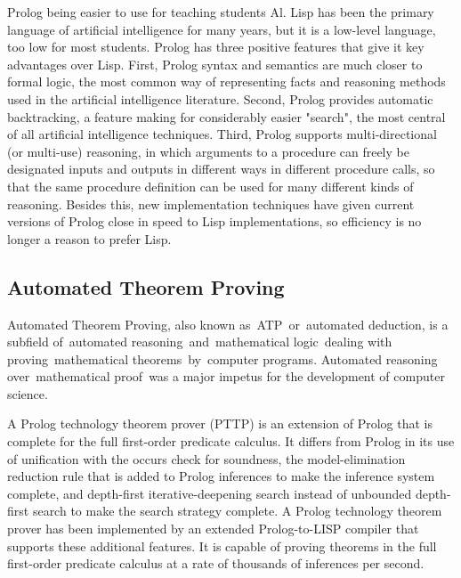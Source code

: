 \documentclass[14pt]{article}
\begin{document}
Prolog being easier to use for teaching students Al. Lisp has been the 
primary language of artificial intelligence for many years, but it is a 
low-level language, too low for most students. Prolog has three positive
features that give it key advantages over Lisp. First, Prolog syntax and
semantics are much closer to formal logic, the most common way of 
representing facts and reasoning methods used in the artificial 
intelligence literature. Second, Prolog provides automatic backtracking,
a feature making for considerably easier "search", the most central of 
all artificial intelligence techniques. Third, Prolog supports 
multi-directional (or multi-use) reasoning, in which arguments to a 
procedure can freely be designated inputs and outputs in different 
ways in different procedure calls, so that the same procedure 
definition can be used for many different kinds of reasoning.
Besides this, new implementation techniques have given current 
versions of Prolog close in speed to Lisp implementations,
so efficiency is no longer a reason to prefer Lisp.

\subsection{Automated Theorem Proving}

Automated Theorem Proving, also known as ATP or automated deduction, is 
a subfield of automated reasoning and mathematical logic dealing with 
proving mathematical theorems by computer programs. Automated reasoning 
over mathematical proof was a major impetus for the development of 
computer science.

A Prolog technology theorem prover (PTTP) is an extension of Prolog that
is complete for the full first-order predicate calculus. It differs from
Prolog in its use of unification with the occurs check for soundness,
the model-elimination reduction rule that is added to Prolog inferences
to make the inference system complete, and depth-first 
iterative-deepening search instead of unbounded depth-first search to 
make the search strategy complete. A Prolog technology theorem prover 
has been implemented by an extended Prolog-to-LISP compiler that 
supports these additional features. It is capable of proving theorems 
in the full first-order predicate calculus at a rate of thousands 
of inferences per second.
\end{document}
